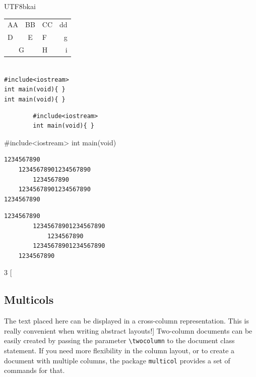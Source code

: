 \documentclass[12pt]{article}
\begin{document}
\begin{CJK*}{UTF8}{bkai}
	\begin{center}
		\begin{tabular}[c]{| l | c || p{3em} ||| r | @{**}  }
			\hline\hline
			
			AA & BB & CC & dd\\
			
			D & E & F & g\\
			
			\cline{1-2}
			
			\multicolumn{2}{|c|}{G}  &  H  &  i \\
			
			\hline
		\end{tabular}
	\end{center}

	\noindent\\
	\verb|#include<iostream>|\\
	\verb|int main(void){ }|\\
	\verb*|int main(void){ }|
	
	\begin{verbatim}
		#include<iostream>
		int main(void){ }
	\end{verbatim}

	\begin{verbatim*}
	#include<iostream>
	int main(void){ 
		}
	\end{verbatim*}

	\begin{Verbatim}
1234567890
	12345678901234567890
		1234567890
	12345678901234567890
1234567890
	\end{Verbatim}
	
	\begin{Verbatim}[tabsize=4]
	1234567890
		12345678901234567890
			1234567890
		12345678901234567890
	1234567890
	\end{Verbatim}

	\begin{multicols}{3}
	[\subsection{Multicols}The text placed here can be displayed in a cross-column representation. This is really convenient when writing abstract layouts!]
	Two-column documents can be easily created by passing the parameter \verb|\twocolumn| to the document class statement. If you need more flexibility in the column layout, or to create a document with multiple columns, the package \verb|multicol| provides a set of commands for that.	%
	\end{multicols}


\end{CJK*}
\end{document}
